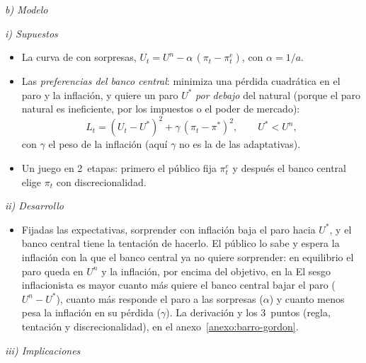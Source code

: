 \documentclass[11pt]{article}
\begin{document}
\hspace*{4.8em}\emph{b) Modelo}

\hspace*{6em}\emph{i) Supuestos}

\begin{itemize}
\item La curva de  con sorpresas, $U_t=U^n-\alpha\,(\pi_t-\pi^e_t)$, con $\alpha=1/a$.
\item Las \emph{preferencias del banco central}: minimiza una pérdida cuadrática en el paro y la inflación, y quiere un paro $U^*$ \emph{por debajo} del natural (porque el paro natural es ineficiente, por los impuestos o el poder de mercado):
  \begin{equation*}
  L_t=(U_t-U^*)^2+\gamma\,(\pi_t-\pi^*)^2,\qquad U^*<U^n,
  \end{equation*}
  con $\gamma$ el peso de la inflación (aquí $\gamma$ no es la de las adaptativas).
\item Un juego en 2~etapas: primero el público fija $\pi^e_t$ y después el banco central elige $\pi_t$ con discrecionalidad.
\end{itemize}

\hspace*{6em}\emph{ii) Desarrollo}

\begin{itemize}
\item Fijadas las expectativas, sorprender con inflación baja el paro hacia $U^*$, y el banco central tiene la tentación de hacerlo. El público lo sabe y espera la inflación con la que el banco central ya no quiere sorprender: en equilibrio el paro queda en $U^n$ y la inflación, por encima del objetivo, en la 
  El sesgo inflacionista es mayor cuanto más quiere el banco central bajar el paro ($U^n-U^*$), cuanto más responde el paro a las sorpresas ($\alpha$) y cuanto menos pesa la inflación en su pérdida ($\gamma$). La derivación y los 3~puntos (regla, tentación y discrecionalidad), en el anexo~\ref{anexo:barro-gordon}.
\end{itemize}

\hspace*{6em}\emph{iii) Implicaciones}
\end{document}
